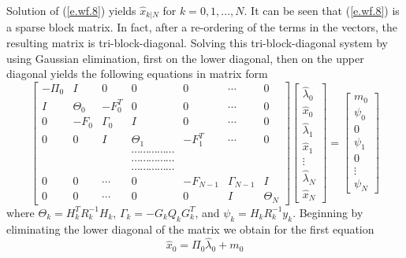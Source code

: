 	Solution of (\ref{e.wf.8}) yields $\hat{x}_{k|N}$ for 
$k=0,1,\ldots,N$.  It can be seen that (\ref{e.wf.8}) is a
sparse block matrix.  In fact, after a re-ordering of the terms
in the vectors, the resulting matrix is tri-block-diagonal.
Solving this tri-block-diagonal system by using Gaussian
elimination, first on the lower diagonal, then on the 
upper diagonal yields the following equations in matrix form
%
\begin{equation}
\left[\begin{array}{ccccccc}
         -\Pi_0&I&0&0&0&\cdots&0\\
         I&\Theta_0&-F_0^T&0&0&\cdots&0\\
         0&-F_0&\Gamma_0&I&0&\cdots&0\\
         0&0&I&\Theta_1&-F_1^T&\cdots&0\\
         &&&\cdots\cdots\cdots\cdots\cdots&&&\\
         &&&\cdots\cdots\cdots\cdots\cdots&&&\\
         &&&\cdots\cdots\cdots\cdots\cdots&&&\\
         0&0&\cdots&0&-F_{N-1}&\Gamma_{N-1}&I\\
         0&0&\cdots&0&0&I&\Theta_N\end{array}\right]
\left[\begin{array}{c}
         \hat{\lambda}_0\\
         \hat{x}_0\\
         \hat{\lambda}_1\\
         \hat{x}_1\\
         \vdots\\
         \hat{\lambda}_N\\
         \hat{x}_N\end{array}\right]
=\left[\begin{array}{c}
         m_0\\
         \psi_0\\
         0\\
         \psi_1\\
         0\\
         \vdots\\
         \psi_N\end{array}\right]
\label{e.wf.8a}
\end{equation}
%
where $\Theta_k=H_k^TR_k^{-1}H_k$, $\Gamma_k=-G_kQ_kG_k^T$, and
$\psi_k=H_kR_k^{-1}y_k$.
Beginning by eliminating the lower diagonal of the matrix 
we obtain for the first
equation
%
\begin{equation}
\hat{x}_0=\Pi_0\hat{\lambda}_0+m_0
\label{e.wf.8.b}
\end{equation}
